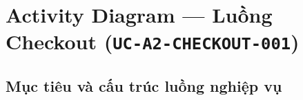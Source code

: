 
\section{Activity Diagram --- Luồng Checkout (\texttt{UC-A2-CHECKOUT-001})}
\label{sec:a2-activity-checkout}

\subsection{Mục tiêu và cấu trúc luồng nghiệp vụ}

